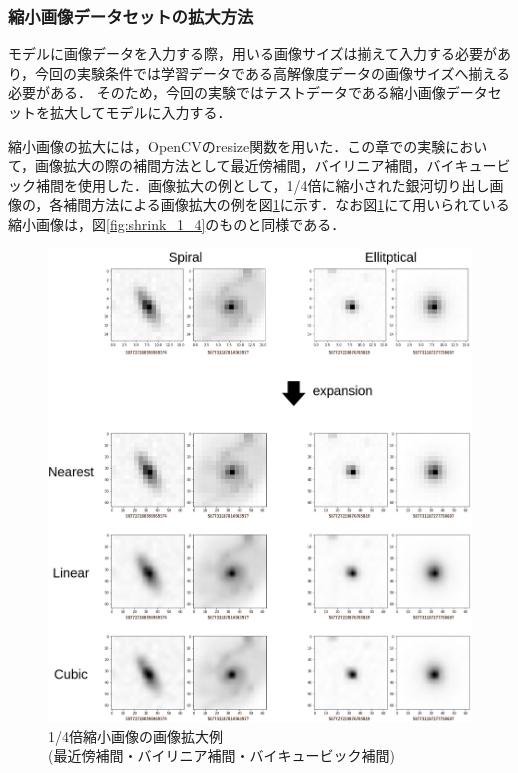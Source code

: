 \documentclass[a4j, 11pt]{jreport}
\begin{document}
\subsubsection{縮小画像データセットの拡大方法}
モデルに画像データを入力する際，用いる画像サイズは揃えて入力する必要があり，今回の実験条件では学習データである高解像度データの画像サイズへ揃える必要がある．
そのため，今回の実験ではテストデータである縮小画像データセットを拡大してモデルに入力する．

縮小画像の拡大には，OpenCVのresize関数を用いた．この章での実験において，画像拡大の際の補間方法として最近傍補間，バイリニア補間，バイキュービック補間を使用した．画像拡大の例として，1/4倍に縮小された銀河切り出し画像の，各補間方法による画像拡大の例を図\ref{fig:kakudai_1_4}に示す．なお図\ref{fig:kakudai_1_4}にて用いられている縮小画像は，図\ref{fig:shrink_1_4}のものと同様である．

\begin{figure}[H]
 \centering
 \includegraphics[width=13cm]{images/drawio/5syou_kakudai.png}
 \caption{1/4倍縮小画像の画像拡大例\\(最近傍補間・バイリニア補間・バイキュービック補間)}
 \label{fig:kakudai_1_4}
\end{figure}
\end{document}
